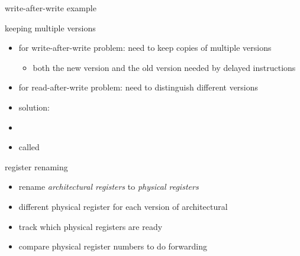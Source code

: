 \begin{frame}[fragile,label=wawExamples]{write-after-write example}
\end{frame}

\begin{frame}{keeping multiple versions}
    \begin{itemize}
    \item for write-after-write problem: need to keep copies of multiple versions
        \begin{itemize}
        \item both the new version and the old version needed by delayed instructions
        \end{itemize}
    \item for read-after-write problem: need to distinguish different versions
    \item solution: 
    \item {}
    \vspace{.5cm}
    \item called 
    \end{itemize}
\end{frame}

\begin{frame}{register renaming}
    \begin{itemize}
    \item rename \textit{architectural registers} to \textit{physical registers}
    \item different physical register for each version of architectural
    \item track which physical registers are ready
    \item compare physical register numbers to do forwarding
    \end{itemize}
\end{frame}
